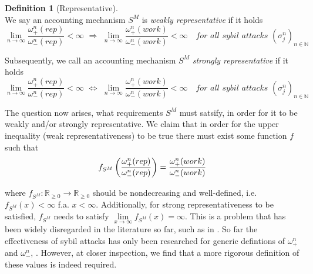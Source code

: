 \documentclass[11pt,a4paper]{article}
\theoremstyle{definition}
\newtheorem{definition}{Definition}[section]
\theoremstyle{theorem}
\theoremstyle{proposition}
\theoremstyle{corollary}
\theoremstyle{lemma}
\theoremstyle{example}
\theoremstyle{remark}
\begin{document}
\begin{definition}[Representative]\ \\
\noindent{}We say an accounting mechanism $S^M$ is {\it weakly representative} if it holds \vspace{1em}\\

\[
\lim\limits_{n\rightarrow\infty}\frac{\omega^n_{+}(rep)}{\omega^n_{-}(rep)}<\infty\,\, \Longrightarrow \,\,\lim\limits_{n\rightarrow\infty}\frac{\omega^n_{+}(work)}{\omega^n_{-}(work)}<\infty \quad\textit{for all sybil attacks }(\sigma_j^n)_{n\in\mathbb{N}}
\]

\noindent{}Subsequently, we call an accounting mechanism $S^M$ {\it strongly representative} if it holds \vspace{1em}\\

\[
\lim\limits_{n\rightarrow\infty}\frac{\omega^n_{+}(rep)}{\omega^n_{-}(rep)}<\infty\,\, \Longleftrightarrow  \,\,\lim\limits_{n\rightarrow\infty}\frac{\omega^n_{+}(work)}{\omega^n_{-}(work)}<\infty \quad\textit{for all sybil attacks }(\sigma_j^n)_{n\in\mathbb{N}}
\]

\end{definition}

\noindent{}The question now arises, what requirements $S^M$ must satsify, in order for it to be weakly and/or strongly representative. We claim that in order for the upper inequality (weak representativeness) to be true there must exist some function $f$ such that \vspace{1em}\\

\[
f_{S^M}\left(\frac{\omega^{n}_{+}(rep)}{\omega^{n}_{-}(rep)}\right) = \frac{\omega^{n}_{+}(work)}{\omega^{n}_{-}(work)} \vspace{1em}\\
\]

\noindent{}where $f_{S^M}:\mathbb{R}_{\geq{}0}\rightarrow\mathbb{R}_{\geq{}0}$ should be nondecreasing and well-defined, i.e. $f_{S^M}(x)<\infty$ f.a. $x<\infty$. Additionally, for strong representativeness to be satisfied, $f_{S^M}$ needs to satisfy $\lim\limits_{x\rightarrow\infty}f_{S^M}(x)=\infty$. This is a problem that has been widely disregarded in the literature so far, such as in \cite{A Random Walk Based Trust Ranking in Distributed Systems}. So far the effectiveness of sybil attacks has only been researched for generic defintions of $\omega_{+}^{n}$ and $\omega_{-}^{n}$, \cite{On the Sybil-Proofness of Accounting Mechanisms}. However, at closer inspection, we find that a more rigorous definition of these values is indeed required. \vspace{1em}\\ 
\end{document}

